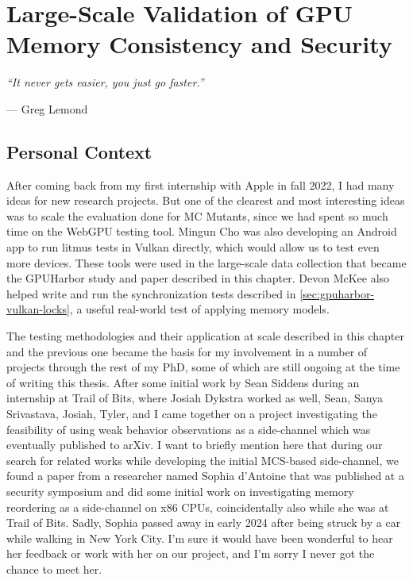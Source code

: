\chapter[Large-Scale Validation of GPU Memory Consistency and Security]{Large-Scale Validation of GPU Memory Consistency and Security}
\label{chap:gpuharbor}

\epigraph{\textit{``It never gets easier, you just go faster.''}}{--- Greg Lemond}

\section{Personal Context}

After coming back from my first internship with Apple in fall 2022, I had many ideas for new research projects. But one of the clearest and most interesting ideas was to scale the evaluation done for MC Mutants, since we had spent so much time on the WebGPU testing tool. Mingun Cho was also developing an Android app to run litmus tests in Vulkan directly, which would allow us to test even more devices. These tools were used in the large-scale data collection that became the GPUHarbor study and paper described in this chapter. Devon McKee also helped write and run the synchronization tests described in \mysec\ref{sec:gpuharbor-vulkan-locks}, a useful real-world test of applying memory models.

The testing methodologies and their application at scale described in this chapter and the previous one became the basis for my involvement in a number of projects through the rest of my PhD, some of which are still ongoing at the time of writing this thesis. After some initial work by Sean Siddens during an internship at Trail of Bits, where Josiah Dykstra worked as well, Sean, Sanya Srivastava, Josiah, Tyler, and I came together on a project investigating the feasibility of using weak behavior observations as a side-channel which was eventually published to arXiv. I want to briefly mention here that during our search for related works while developing the initial MCS-based side-channel, we found a paper from a researcher named Sophia d'Antoine that was published at a security symposium and did some initial work on investigating memory reordering as a side-channel on x86 CPUs, coincidentally also while she was at Trail of Bits. Sadly, Sophia passed away in early 2024 after being struck by a car while walking in New York City. I'm sure it would have been wonderful to hear her feedback or work with her on our project, and I'm sorry I never got the chance to meet her.

